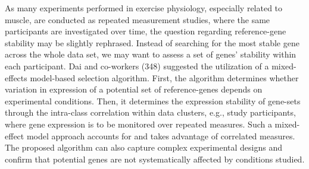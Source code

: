 \documentclass[twoside,10pt]{gihclass} %
\begin{document}
As many experiments performed in exercise physiology, especially related to muscle, are conducted as repeated measurement studies, where the same participants are investigated over time, the question regarding reference-gene stability may be slightly rephrased. Instead of searching for the most stable gene across the whole data set, we may want to assess a set of genes' stability within each participant.
Dai and co-workers (348) suggested the utilization of a mixed-effects model-based selection algorithm.
First, the algorithm determines whether variation in expression of a potential set of reference-genes depends on experimental conditions.
Then, it determines the expression stability of gene-sets through the intra-class correlation within data clusters, e.g., study participants, where gene expression is to be monitored over repeated measures.
Such a mixed-effect model approach accounts for and takes advantage of correlated measures.
The proposed algorithm can also capture complex experimental designs and confirm that potential genes are not systematically affected by conditions studied.
\end{document}
